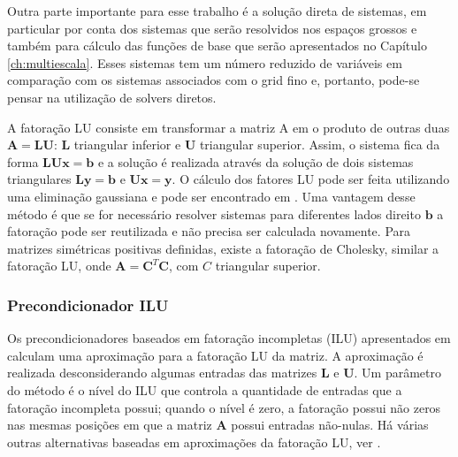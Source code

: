 Outra parte importante para esse trabalho é a solução direta de sistemas, em particular por conta dos sistemas que serão resolvidos nos espaços grossos e também para cálculo das funções de base que serão apresentados no Capítulo \ref{ch:multiescala}. Esses sistemas tem um número reduzido de variáveis em comparação com os sistemas associados com o grid fino e, portanto, pode-se pensar na utilização de solvers diretos.

A fatoração LU consiste em transformar a matriz A em o produto de outras duas $\mathbf{A}=\mathbf{L}\mathbf{U}$: $\mathbf{L}$ triangular inferior e $\mathbf{U}$ triangular superior. Assim, o sistema fica da forma $\mathbf{L} \mathbf{U} \mathbf{x} = \mathbf{b}$ e a solução é realizada através da solução de dois sistemas triangulares $\mathbf{L}\mathbf{y} = \mathbf{b}$ e $\mathbf{U}\mathbf{x} = \mathbf{y}$. O cálculo dos fatores LU pode ser feita utilizando uma eliminação gaussiana e pode ser encontrado em \citet{heath1997scientific}. Uma vantagem desse método é que se for necessário resolver sistemas para diferentes lados direito $\mathbf{b}$ a fatoração pode ser reutilizada e não precisa ser calculada novamente. Para matrizes simétricas positivas definidas, existe a fatoração de Cholesky, similar a fatoração LU, onde $\mathbf{A} = \mathbf{C}^T \mathbf{C}$, com $C$ triangular superior.


\subsubsection{Precondicionador ILU}

Os precondicionadores baseados em fatoração incompletas (ILU) apresentados em \citet{ilupaper} calculam uma aproximação para a fatoração LU da matriz. A aproximação é realizada desconsiderando algumas entradas das matrizes $\mathbf{L}$ e $\mathbf{U}$. Um parâmetro do método é o nível do ILU que controla a quantidade de entradas que a fatoração incompleta possui; quando o nível é  zero, a fatoração possui não zeros nas mesmas posições em que a matriz $\mathbf{A}$ possui entradas não-nulas. Há várias outras alternativas baseadas em aproximações da fatoração LU, ver \cite{solverlinear}.
